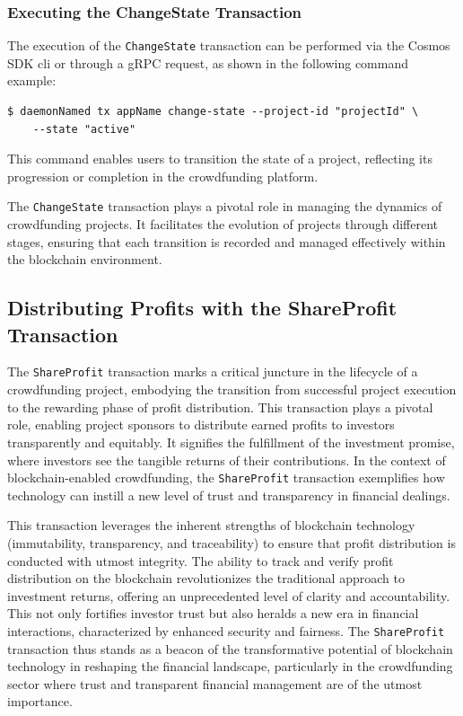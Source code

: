 \subsubsection{Executing the ChangeState Transaction}
\label{subsubsec:executing-change-state}

The execution of the \texttt{ChangeState} transaction can be performed via the Cosmos SDK \gls{cli} or through a gRPC request, as shown in the following command example:

\begin{verbatim}
$ daemonNamed tx appName change-state --project-id "projectId" \
    --state "active"
\end{verbatim}

This command enables users to transition the state of a project, reflecting its progression or completion in the crowdfunding platform.

The \texttt{ChangeState} transaction plays a pivotal role in managing the dynamics of crowdfunding projects. It facilitates the evolution of projects through different stages, ensuring that each transition is recorded and managed effectively within the blockchain environment.


\subsection{Distributing Profits with the ShareProfit Transaction}
\label{subsec:share-profit}

The \texttt{ShareProfit} transaction marks a critical juncture in the lifecycle of a crowdfunding project, embodying the transition from successful project execution to the rewarding phase of profit distribution. This transaction plays a pivotal role, enabling project sponsors to distribute earned profits to investors transparently and equitably. It signifies the fulfillment of the investment promise, where investors see the tangible returns of their contributions. In the context of blockchain-enabled crowdfunding, the \texttt{ShareProfit} transaction exemplifies how technology can instill a new level of trust and transparency in financial dealings.

This transaction leverages the inherent strengths of blockchain technology (immutability, transparency, and traceability) to ensure that profit distribution is conducted with utmost integrity. The ability to track and verify profit distribution on the blockchain revolutionizes the traditional approach to investment returns, offering an unprecedented level of clarity and accountability. This not only fortifies investor trust but also heralds a new era in financial interactions, characterized by enhanced security and fairness. The \texttt{ShareProfit} transaction thus stands as a beacon of the transformative potential of blockchain technology in reshaping the financial landscape, particularly in the crowdfunding sector where trust and transparent financial management are of the utmost importance.

